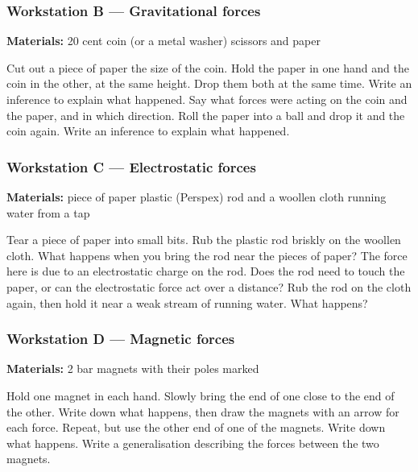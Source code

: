 \clearpage
\subsubsection*{Workstation B --- Gravitational forces}
\textbf{Materials:} 20 cent coin (or a metal washer) \textbullet{} scissors and paper\par
{}
Cut out a piece of paper the size of the coin.
Hold the paper in one hand and the coin in the other, at the same height. Drop them both at the same time.
Write an inference to explain what happened. Say what forces were acting on the coin and the paper, and in which direction.
Roll the paper into a ball and drop it and the coin again.
Write an inference to explain what happened.

\clearpage
\subsubsection*{Workstation C --- Electrostatic forces}
\textbf{Materials:} piece of paper \textbullet{} plastic (Perspex) rod and a woollen cloth \textbullet{} running water from a tap\par
{}
Tear a piece of paper into small bits. Rub the plastic rod briskly on the woollen cloth.
What happens when you bring the rod near the pieces of paper?
The force here is due to an electrostatic charge on the rod. Does the rod need to touch the paper, or can the electrostatic force act over a distance?
Rub the rod on the cloth again, then hold it near a weak stream of running water. What happens?

\clearpage
\subsubsection*{Workstation D --- Magnetic forces}
\textbf{Materials:} 2 bar magnets with their poles marked\par
{}
Hold one magnet in each hand. Slowly bring the end of one close to the end of the other. Write down what happens, then draw the magnets with an arrow for each force.
Repeat, but use the other end of one of the magnets. Write down what happens.
Write a generalisation describing the forces between the two magnets. 


